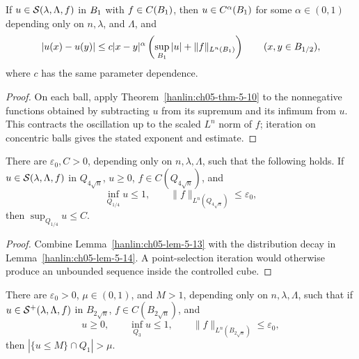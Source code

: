\begin{corollary}\label{hanlin:ch05-cor-5-11}
If $u\in\mathcal{S}(\lambda,\Lambda,f)$ in $B_1$ with $f\in C(B_1)$,
then $u\in C^{\alpha}(B_1)$ for some $\alpha\in(0,1)$ depending only on
$n,\lambda$, and $\Lambda$, and
\[
|u(x)-u(y)|\leq c|x-y|^\alpha
\left(\sup_{B_1}|u|+\|f\|_{L^n(B_1)}\right)
\qquad(x,y\in B_{1/2}),
\]
where $c$ has the same parameter dependence.
\end{corollary}
\begin{proof}
\sketch On each ball, apply Theorem~\ref{hanlin:ch05-thm-5-10} to the
nonnegative functions obtained by subtracting $u$ from its supremum and its
infimum from $u$. This contracts the oscillation up to the scaled $L^n$ norm
of $f$; iteration on concentric balls gives the stated exponent and estimate.
\end{proof}

\begin{lemma}\label{hanlin:ch05-lem-5-12}
There are $\varepsilon_0,C>0$, depending only on $n,\lambda,\Lambda$,
such that the following holds. If
$u\in\mathcal{S}(\lambda,\Lambda,f)$ in $Q_{4\sqrt n}$, $u\geq0$,
$f\in C(Q_{4\sqrt n})$, and
\[
\inf_{Q_{1/4}}u\leq1,
\qquad
\|f\|_{L^n(Q_{4\sqrt n})}\leq\varepsilon_0,
\]
then $\sup_{Q_{1/4}}u\leq C$.
\end{lemma}

\begin{proof}
\sketch Combine Lemma~\ref{hanlin:ch05-lem-5-13} with the distribution
decay in Lemma~\ref{hanlin:ch05-lem-5-14}. A point-selection iteration
would otherwise produce an unbounded sequence inside the controlled cube.
\end{proof}

\begin{lemma}\label{hanlin:ch05-lem-5-13}
There are $\varepsilon_0>0$, $\mu\in(0,1)$, and $M>1$, depending
only on $n,\lambda,\Lambda$, such that if
$u\in\mathcal{S}^{+}(\lambda,\Lambda,f)$ in $B_{2\sqrt n}$,
$f\in C(B_{2\sqrt n})$, and
\[
u\geq0,\qquad \inf_{Q_3}u\leq1,\qquad
\|f\|_{L^n(B_{2\sqrt n})}\leq\varepsilon_0,
\]
then $|\{u\leq M\}\cap Q_1|>\mu$.
\end{lemma}

